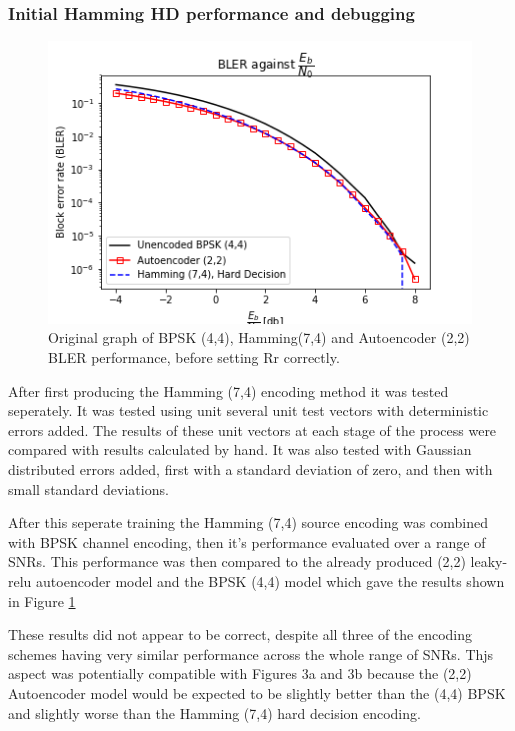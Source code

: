 \documentclass[12pt,onecolumn,letterpaper]{article}
\begin{document}
\subsubsection{Initial Hamming HD performance and debugging}

\begin{figure}
   \centering
   \includegraphics[width=0.6\linewidth]{figures/bler_vs_eb_only_three.png}
   \caption{Original graph of BPSK (4,4), Hamming(7,4) and Autoencoder (2,2) BLER performance, before setting Rr correctly.}
   \label{fig:BlerOriginalHammingBpskAe22}
\end{figure}

After first producing the Hamming (7,4) encoding method it was tested seperately. It was tested using unit several unit test vectors with deterministic errors added. The results of these unit vectors at each stage of the process were compared with results calculated by hand. It was also tested with Gaussian distributed errors added, first with a standard deviation of zero, and then with small standard deviations.

After this seperate training the Hamming (7,4) source encoding was combined with BPSK channel encoding, then it's performance evaluated over a range of SNRs. This performance was then compared to the already produced (2,2) leaky-relu autoencoder model and the BPSK (4,4) model which gave the results shown in Figure \ref{fig:BlerOriginalHammingBpskAe22}


These results did not appear to be correct, despite all three of the encoding schemes having very similar performance across the whole range of SNRs. Thjs aspect was potentially compatible with Figures 3a and 3b because the (2,2) Autoencoder model would be expected to be slightly better than the (4,4) BPSK and slightly worse than the Hamming (7,4) hard decision encoding.
\end{document}
